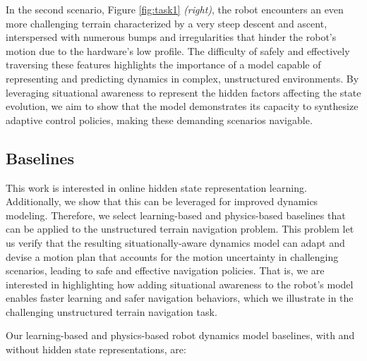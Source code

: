 \documentclass[Afour,sageh,times]{sagej}
\theoremstyle{lemma}
\begin{document}
In the second scenario, Figure \ref{fig:task1} \textit{(right)}, the robot encounters an even more challenging terrain characterized by a very steep descent and ascent, interspersed with numerous bumps and irregularities that hinder the robot's motion due to the hardware's low profile. The difficulty of safely and effectively traversing these features highlights the importance of a model capable of representing and predicting dynamics in complex, unstructured environments. By leveraging situational awareness to represent the hidden factors affecting the state evolution, we aim to show that the model demonstrates its capacity to synthesize adaptive control policies, making these demanding scenarios navigable. 

\subsection{Baselines} \label{sec:baselines-ugv}

This work is interested in online hidden state representation learning. Additionally, we show that this can be leveraged for improved dynamics modeling. Therefore, we select learning-based and physics-based baselines that can be applied to the unstructured terrain navigation problem. This problem let us verify that the resulting situationally-aware dynamics model can adapt and devise a motion plan that accounts for the motion uncertainty in challenging scenarios, leading to safe and effective navigation policies. That is, we are interested in highlighting how adding situational awareness to the robot's model enables faster learning and safer navigation behaviors, which we illustrate in the challenging unstructured terrain navigation task.

Our learning-based and physics-based robot dynamics model baselines, with and without hidden state representations, are:
\end{document}

